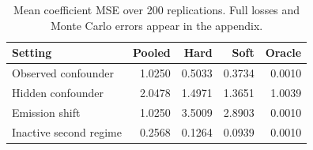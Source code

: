 \begin{table}[htbp]\centering\small
\begin{tabular}{lrrrr}\toprule
Setting & Pooled & Hard & Soft & Oracle\\\midrule
Observed confounder & 1.0250 & 0.5033 & 0.3734 & 0.0010\\
Hidden confounder & 2.0478 & 1.4971 & 1.3651 & 1.0039\\
Emission shift & 1.0250 & 3.5009 & 2.8903 & 0.0010\\
Inactive second regime & 0.2568 & 0.1264 & 0.0939 & 0.0010\\
\bottomrule\end{tabular}
\caption{Mean coefficient MSE over 200 replications. Full losses and Monte Carlo errors appear in the appendix.}
\end{table}